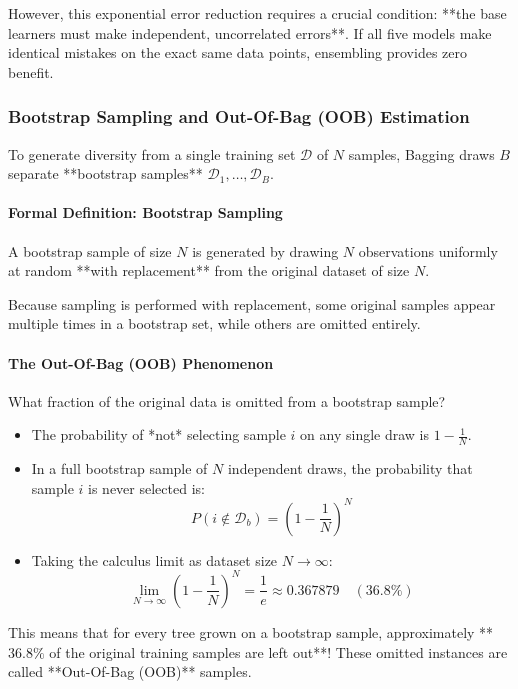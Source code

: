 However, this exponential error reduction requires a crucial condition: **the base learners must make independent, uncorrelated errors**. If all five models make identical mistakes on the exact same data points, ensembling provides zero benefit.

\subsubsection{Bootstrap Sampling and Out-Of-Bag (OOB) Estimation}
To generate diversity from a single training set $\mathcal{D}$ of $N$ samples, Bagging draws $B$ separate **bootstrap samples** $\mathcal{D}_1, \dots, \mathcal{D}_B$.

\paragraph{Formal Definition: Bootstrap Sampling}
A bootstrap sample of size $N$ is generated by drawing $N$ observations uniformly at random **with replacement** from the original dataset of size $N$.

Because sampling is performed with replacement, some original samples appear multiple times in a bootstrap set, while others are omitted entirely.

\paragraph{The Out-Of-Bag (OOB) Phenomenon}
What fraction of the original data is omitted from a bootstrap sample?
\begin{itemize}
    \item The probability of *not* selecting sample $i$ on any single draw is $1 - \frac{1}{N}$.
    \item In a full bootstrap sample of $N$ independent draws, the probability that sample $i$ is never selected is:
    \begin{equation}
    P(i \notin \mathcal{D}_b) = \left( 1 - \frac{1}{N} \right)^N
    \end{equation}
    \item Taking the calculus limit as dataset size $N \to \infty$:
    \begin{equation}
    \lim_{N \to \infty} \left( 1 - \frac{1}{N} \right)^N = \frac{1}{e} \approx 0.367879 \quad (\mathbf{36.8\%})\label{eq:oob_limit}
    \end{equation}
\end{itemize}
This means that for every tree grown on a bootstrap sample, approximately **$36.8\%$ of the original training samples are left out**! These omitted instances are called **Out-Of-Bag (OOB)** samples.

